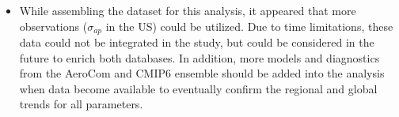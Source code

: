 \documentclass[acp, manuscript]{copernicus}
\begin{document}
\begin{itemize}
 \item While assembling the dataset for this analysis, it appeared that more observations ($\sigma_{ap}$ in the US) could be utilized. Due to time limitations, these data could not be integrated in the study, but could be considered in the future to enrich both databases. In addition, more models and diagnostics from the AeroCom and CMIP6 ensemble should be added into the analysis when data become available to eventually confirm the regional and global trends for all parameters.
\end{itemize}

















\end{document}

